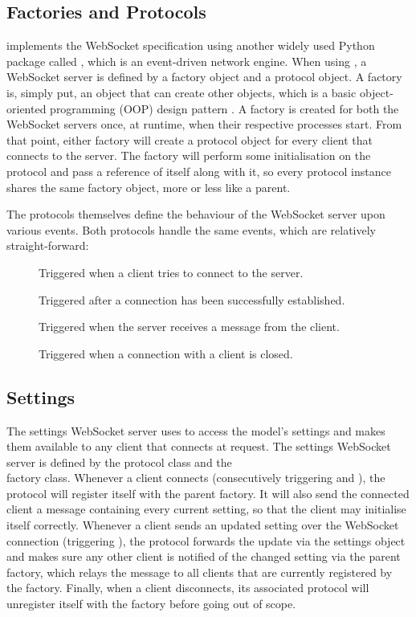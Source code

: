 \documentclass[a4paper, openany, oneside]{memoir}
\begin{document}
\subsection{Factories and Protocols}
\label{sub:presenter-autobahn}
 implements the WebSocket specification using another widely used Python package called , which is an event-driven network engine. When using , a WebSocket server is defined by a factory object and a protocol object. A factory is, simply put, an object that can create other objects, which is a basic object-oriented programming (OOP) design pattern \cite{msdn-observer}. A factory is created for both the WebSocket servers once, at runtime, when their respective processes start. From that point, either factory will create a protocol object for every client that connects to the server. The factory will perform some initialisation on the protocol and pass a reference of itself along with it, so every protocol instance shares the same factory object, more or less like a parent.

The protocols themselves define the behaviour of the WebSocket server upon various events. Both protocols handle the same events, which are relatively straight-forward:
\begin{description}
	\item[] Triggered when a client tries to connect to the server.
	\item[] Triggered after a connection has been successfully established.
	\item[] Triggered when the server receives a message from the client.
	\item[] Triggered when a connection with a client is closed.
\end{description}

\subsection{Settings}
\label{sub:websocket_settings}
The settings WebSocket server uses  to access the model's settings and makes them available to any client that connects at request. The settings WebSocket server is defined by the  protocol class and the\\  factory class.
Whenever a client connects (consecutively triggering  and ), the protocol will register itself with the parent factory. It will also send the connected client a message containing every current setting, so that the client may initialise itself correctly. Whenever a client sends an updated setting over the WebSocket connection (triggering ), the protocol forwards the update via the  settings object and makes sure any other client is notified of the changed setting via the parent factory, which relays the message to all clients that are currently registered by the factory. Finally, when a client disconnects, its associated protocol will unregister itself with the factory before going out of scope.
\end{document}
